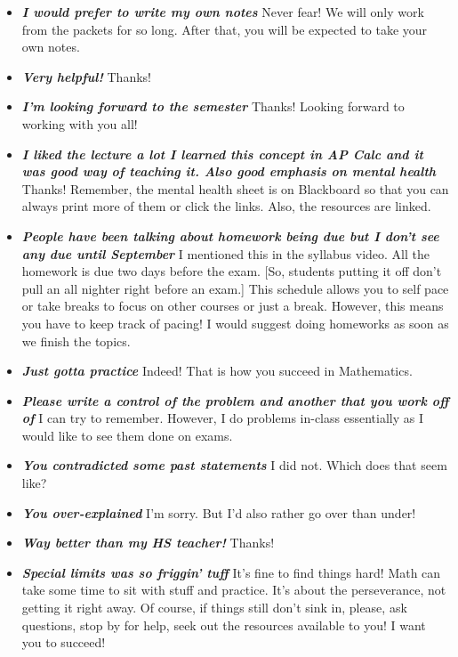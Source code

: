 \documentclass[11pt,letterpaper]{article}
\begin{document}
\begin{itemize}
\item {\bfseries\itshape I would prefer to write my own notes} Never fear! We will only work from the packets for so long. After that, you will be expected to take your own notes.

\item {\bfseries\itshape Very helpful!} Thanks!

\item {\bfseries\itshape I'm looking forward to the semester} Thanks! Looking forward to working with you all!

\item {\bfseries\itshape I liked the lecture a lot I learned this concept in AP Calc and it was good way of teaching it. Also good emphasis on mental health} Thanks! Remember, the mental health sheet is on Blackboard so that you can always print more of them or click the links. Also, the resources are linked. 

\item {\bfseries\itshape People have been talking about homework being due but I don't see any due until September} I mentioned this in the syllabus video. All the homework is due two days before the exam. [So, students putting it off don't pull an all nighter right before an exam.] This schedule allows you to self pace or take breaks to focus on other courses or just a break. However, this means you have to keep track of pacing! I would suggest doing homeworks as soon as we finish the topics. 

\item {\bfseries\itshape Just gotta practice} Indeed! That is how you succeed in Mathematics. 

\item {\bfseries\itshape Please write a control of the problem and another that you work off of} I can try to remember. However, I do problems in-class essentially as I would like to see them done on exams. 

\item {\bfseries\itshape You contradicted some past statements} I did not. Which does that seem like?

\item {\bfseries\itshape You over-explained} I'm sorry. But I'd also rather go over than under!

\item {\bfseries\itshape Way better than my HS teacher!} Thanks!

\item {\bfseries\itshape Special limits was so friggin' tuff} It's fine to find things hard! Math can take some time to sit with stuff and practice. It's about the perseverance, not getting it right away. Of course, if things still don't sink in, please, ask questions, stop by for help, seek out the resources available to you! I want you to succeed!


\end{itemize}
\end{document}
